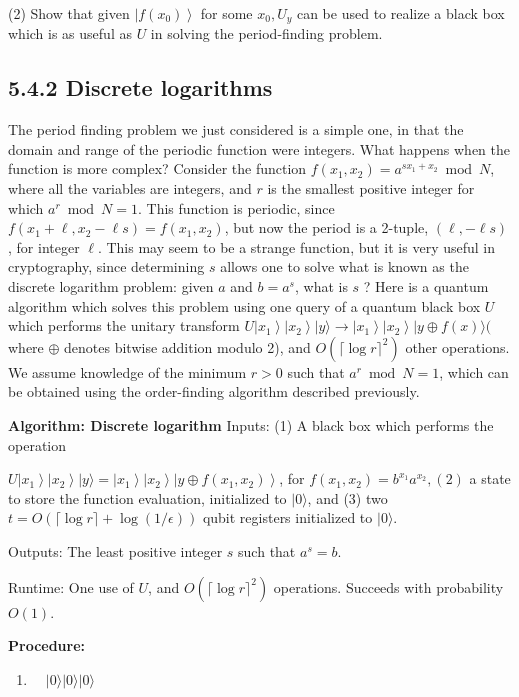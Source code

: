 (2) Show that given $\left|f\left(x_{0}\right)\right\rangle$ for some $x_{0}, U_{y}$ can be used to realize a black box which is as useful as $U$ in solving the period-finding problem.

\subsection*{5.4.2 Discrete logarithms}
The period finding problem we just considered is a simple one, in that the domain and range of the periodic function were integers. What happens when the function is more complex? Consider the function $f\left(x_{1}, x_{2}\right)=a^{s x_{1}+x_{2}} \bmod N$, where all the variables are integers, and $r$ is the smallest positive integer for which $a^{r} \bmod N=1$. This function is periodic, since $f\left(x_{1}+\ell, x_{2}-\ell s\right)=f\left(x_{1}, x_{2}\right)$, but now the period is a 2-tuple, $(\ell,-\ell s)$, for integer $\ell$. This may seem to be a strange function, but it is very useful in cryptography, since determining $s$ allows one to solve what is known as the discrete logarithm problem: given $a$ and $b=a^{s}$, what is $s$ ? Here is a quantum algorithm which solves this problem using one query of a quantum black box $U$ which performs the unitary transform $U\left|x_{1}\right\rangle\left|x_{2}\right\rangle|y\rangle \rightarrow\left|x_{1}\right\rangle\left|x_{2}\right\rangle|y \oplus f(x)\rangle($ where $\oplus$ denotes bitwise addition modulo 2), and $O\left(\lceil\log r\rceil^{2}\right)$ other operations. We assume knowledge of the minimum $r>0$ such that $a^{r} \bmod N=1$, which can be obtained using the order-finding algorithm described previously.

\textbf{Algorithm: Discrete logarithm}
Inputs: (1) A black box which performs the operation

$U\left|x_{1}\right\rangle\left|x_{2}\right\rangle|y\rangle=\left|x_{1}\right\rangle\left|x_{2}\right\rangle\left|y \oplus f\left(x_{1}, x_{2}\right)\right\rangle$, for $f\left(x_{1}, x_{2}\right)=b^{x_{1}} a^{x_{2}},(2)$ a state to store the function evaluation, initialized to $|0\rangle$, and (3) two $t=O(\lceil\log r\rceil+\log (1 / \epsilon))$ qubit registers initialized to $|0\rangle$.

Outputs: The least positive integer $s$ such that $a^{s}=b$.

Runtime: One use of $U$, and $O\left(\lceil\log r\rceil^{2}\right)$ operations. Succeeds with probability $O(1)$.

\textbf{Procedure:}
\begin{enumerate}
  \item $\quad|0\rangle|0\rangle|0\rangle$
\end{enumerate}


